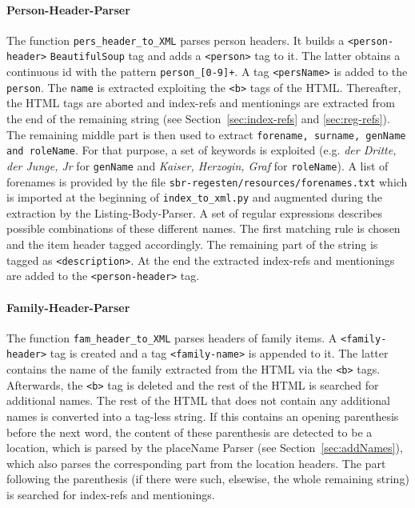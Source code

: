 \paragraph{Person-Header-Parser}
The function \texttt{pers\_header\_to\_XML} parses person headers. It
builds a \texttt{<person-header>} \texttt{BeautifulSoup} tag and adds
a \texttt{<person>} tag to it. The latter obtains a continuous id with
the pattern \texttt{person\_[0-9]+}. A tag \texttt{<persName>} is
added to the \texttt{person}. The \texttt{name} is extracted
exploiting the \texttt{<b>} tags of the HTML. Thereafter, the HTML
tags are aborted and index-refs and mentionings are extracted from the
end of the remaining string (see Section~\ref{sec:index-refs} and
\ref{sec:reg-refs}). The remaining middle part is then used to extract
\texttt{forename, surname, genName and roleName}. For that purpose, a
set of keywords is exploited (e.g. \textit{der Dritte, der Junge, Jr}
for \texttt{genName} and \textit{Kaiser, Herzogin, Graf} for
\texttt{roleName}). A list of forenames is provided by the file
\texttt{sbr-regesten/resources/forenames.txt} which is imported at the
beginning of \texttt{index\_to\_xml.py} and augmented during the
extraction by the Listing-Body-Parser. A set of regular expressions
describes possible combinations of these different names. The first
matching rule is chosen and the item header tagged accordingly. The
remaining part of the string is tagged as \texttt{<description>}. At
the end the extracted index-refs and mentionings are added to the
\texttt{<person-header>} tag.

\paragraph{Family-Header-Parser}
The function \texttt{fam\_header\_to\_XML} parses headers of family
items. A \texttt{<family-header>} tag is created and a tag
\texttt{<family-name>} is appended to it. The latter contains the name
of the family extracted from the HTML via the \texttt{<b>} tags.
Afterwards, the \texttt{<b>} tag is deleted and the rest of the HTML
is searched for additional names. The rest of the HTML that does not
contain any additional names is converted into a tag-less string. If
this contains an opening parenthesis before the next word, the content
of these parenthesis are detected to be a location, which is parsed by
the placeName Parser (see Section~\ref{sec:addNames}), which also
parses the corresponding part from the location headers. The part
following the parenthesis (if there were such, elsewise, the whole
remaining string) is searched for index-refs and mentionings.

